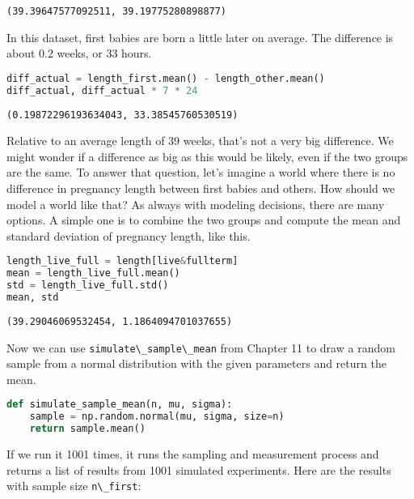\begin{lstlisting}[style=output]
(39.39647577092511, 39.19775280898877)
\end{lstlisting}

In this dataset, first babies are born a little later on average. The
difference is about 0.2 weeks, or 33 hours.

\begin{lstlisting}[language=Python,style=source]
diff_actual = length_first.mean() - length_other.mean()
diff_actual, diff_actual * 7 * 24
\end{lstlisting}

\begin{lstlisting}[style=output]
(0.19872296193634043, 33.38545760530519)
\end{lstlisting}

Relative to an average length of 39 weeks, that's not a very big
difference. We might wonder if a difference as big as this would be
likely, even if the two groups are the same. To answer that question,
let's imagine a world where there is no difference in pregnancy length
between first babies and others. How should we model a world like that?
As always with modeling decisions, there are many options. A simple one
is to combine the two groups and compute the mean and standard deviation
of pregnancy length, like this.

\begin{lstlisting}[language=Python,style=source]
length_live_full = length[live&fullterm]
mean = length_live_full.mean()
std = length_live_full.std()
mean, std
\end{lstlisting}

\begin{lstlisting}[style=output]
(39.29046069532454, 1.1864094701037655)
\end{lstlisting}

Now we can use \passthrough{\lstinline!simulate\_sample\_mean!} from
Chapter 11 to draw a random sample from a normal distribution with the
given parameters and return the mean.

\begin{lstlisting}[language=Python,style=source]
def simulate_sample_mean(n, mu, sigma):
    sample = np.random.normal(mu, sigma, size=n)
    return sample.mean()
\end{lstlisting}

If we run it 1001 times, it runs the sampling and measurement process
and returns a list of results from 1001 simulated experiments. Here are
the results with sample size \passthrough{\lstinline!n\_first!}:

